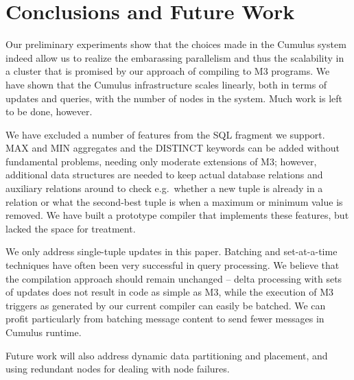 

\section{Conclusions and Future Work}
\label{sec:conclusions}


Our preliminary experiments show that the choices made in the Cumulus
system indeed allow us to realize the embarassing parallelism and
thus the scalability in a cluster that is promised by our approach of
compiling to M3 programs.  We have shown that the Cumulus infrastructure scales linearly, both in terms of updates and queries, with the number of nodes in the system.  Much work is left to be done, however.


We have excluded a number of features from the SQL fragment we support.
MAX and MIN aggregates and the DISTINCT keywords can be added without
fundamental problems, needing only moderate extensions of M3; however,
additional data structures are needed to keep actual database relations
and auxiliary relations
around to check e.g.\ whether a new tuple is already in a relation or what the
second-best tuple is when a maximum or minimum value is removed. We
have built a prototype compiler that implements these features, but lacked the
space for treatment.



We only address single-tuple updates in this paper.
Batching and set-at-a-time techniques have often been
very successful in query processing.
We believe that the compilation approach
should remain unchanged -- delta processing with sets of updates does not
result in code as simple as M3, while the
execution of M3 triggers as generated by our current compiler
can easily be batched. We can profit
particularly from batching message content to send fewer messages in
Cumulus runtime. 



Future work will also address dynamic data partitioning and placement,
and using redundant nodes for
dealing with node failures.


